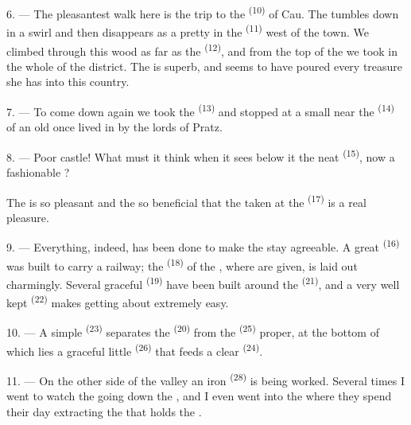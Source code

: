 \VUsaut{3.0mm}
\VUsaut{3.0mm}

6. --- The pleasantest walk here is the trip to the  \textsuperscript{(10)}
of Cau. The  tumbles down in a swirl and then disappears as a pretty
 in the  \textsuperscript{(11)} west of the town. We climbed
through this wood as far as the  \textsuperscript{(12)}, and from the
top of the
 we took in the whole  of the district. The
 is superb, and  seems to have poured every
treasure she has into this country.

7. --- To come down again we took the  \textsuperscript{(13)} and stopped at
a small  near the  \textsuperscript{(14)} of an old
 once lived in by the lords of Pratz.

8. --- Poor castle! What must it think when it sees below it the neat 
\textsuperscript{(15)}, now a fashionable
?

The  is so pleasant and the  so beneficial that the
 taken at the
 \textsuperscript{(17)} is a real pleasure.

\VUsaut{3.0mm}
\VUsaut{3.0mm}

9. --- Everything, indeed, has been done to make the stay agreeable. A great 
\textsuperscript{(16)} was built to carry a railway; the
 \textsuperscript{(18)} of the , where
 are given, is laid out charmingly. Several graceful
 \textsuperscript{(19)} have been built around the 
\textsuperscript{(21)}, and a very well kept  \textsuperscript{(22)} makes
getting about extremely easy.

10. --- A simple  \textsuperscript{(23)} separates the
 \textsuperscript{(20)} from the  \textsuperscript{(25)} proper,
at the bottom of which lies a graceful little  \textsuperscript{(26)} that feeds
a clear  \textsuperscript{(24)}.

11. --- On the other side of the valley an iron  \textsuperscript{(28)} is being
worked. Several times I went to watch the  going down the , and I
even went into the  where they spend their day extracting the 
that holds the .

